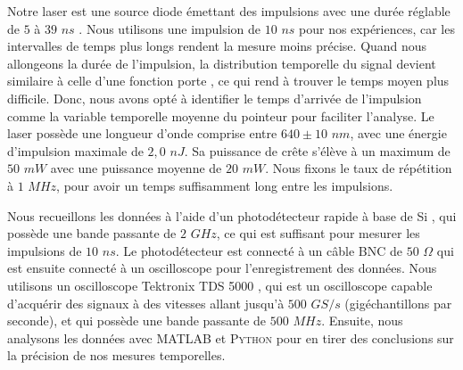 \begin{onehalfspace}
    \noindent Notre laser est une source diode
    émettant des impulsions avec une durée réglable de $5$ à $39$ $ns$ \cite{ThorlabsNPL64B}.
    Nous utilisons une impulsion de $10$ $ns$
    pour nos expériences, car les intervalles de temps plus longs  
    rendent la mesure moins précise. Quand nous allongeons la durée de l'impulsion,
    la distribution temporelle du signal devient similaire à celle d'une 
    fonction porte \cite{ThorlabsNPL64B}, ce qui rend à trouver le 
    temps moyen plus difficile.
    Donc, nous avons opté à identifier le 
    temps d'arrivée de l'impulsion comme la variable temporelle moyenne
    du pointeur pour faciliter l'analyse.
    Le laser possède une longueur d’onde comprise entre 
    $640 \pm 10$ $nm$, avec une énergie d’impulsion maximale de 
    $2,0$ $nJ$. Sa puissance de crête s’élève à un maximum de 
    $50$ $mW$ avec une puissance moyenne de $20$ $mW$. 
    Nous fixons le taux de répétition à $1$ $MHz$, pour avoir un temps 
    suffisamment long entre les impulsions. 
    
    \noindent Nous recueillons les
    données à l'aide d'un photodétecteur rapide à base de Si 
    \cite{ThorlabsDET025A}, qui possède une bande passante de 
    $2$ $GHz$, ce qui est suffisant pour mesurer les impulsions de
    $10$ $ns$. Le photodétecteur est connecté à un câble BNC de 
    $50$ $\Omega$ \cite{ThorlabsBNC} qui est ensuite connecté à 
    un oscilloscope pour l'enregistrement des données.
    Nous utilisons un oscilloscope Tektronix TDS 5000 \cite{TektronixTDS5000}, 
    qui est un oscilloscope capable d’acquérir des signaux à 
    des vitesses allant jusqu’à 
    $500$ $GS/s$ (gigéchantillons par seconde), et qui possède une 
    bande passante de $500$ $MHz$.  
    Ensuite, nous analysons les données avec \textsc{MATLAB} et \textsc{Python}
    pour en tirer des conclusions sur la précision de nos mesures
    temporelles.
    

\end{onehalfspace}

